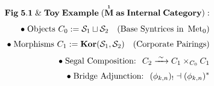 \documentclass[preview]{standalone}
\begin{document}
\begin{align*}
\special{dvisvgm:raw <g id='unique000'>}\mathbf{Fig\;5.1\;\&\;Toy\;Example\;(\overset{\scriptscriptstyle 1}{\mathbf{M}}\;as\;Internal\;Category):}\\[4pt]\bullet\;\text{Objects }C_0 := \mathcal{S}_1 \sqcup \mathcal{S}_2\quad(\text{Base Syntrices in }\operatorname{Met}_0)\\[3pt]\bullet\;\text{Morphisms }C_1 := \mathbf{Kor}(\mathcal{S}_1, \mathcal{S}_2)\quad(\text{Corporate Pairings})\\[3pt]\bullet\;\text{Segal Composition: }\; C_2 \xrightarrow{\;\sim\;} C_1 \times_{C_0} C_1\\[3pt]\bullet\;\text{Bridge Adjunction: }\; (\phi_{k,n})_! \dashv (\phi_{k,n})^*\special{dvisvgm:raw </g>}
\end{align*}
\end{document}
